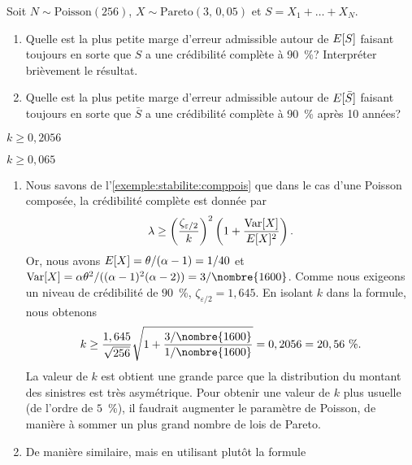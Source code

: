 \begin{exercice}
  Soit $N \sim \text{Poisson}(256)$, $X \sim \text{Pareto}(3,\, 0,05)$
  et $S = X_1 + \dots + X_N$.
  \begin{enumerate}
  \item Quelle est la plus petite marge d'erreur admissible autour de
    $E [ S ]$ faisant toujours en sorte que $S$ a une crédibilité
    complète à 90~\%?  Interpréter brièvement le résultat.
  \item Quelle est la plus petite marge d'erreur admissible autour de
    $E [ \bar{S} ]$ faisant toujours en sorte que $\bar{S}$ a une
    crédibilité complète à 90~\% après 10 années?
  \end{enumerate}
  \begin{rep}
    \begin{inparaenum}
    \item $k \geq 0,2056$
    \item $k \geq 0,065$
    \end{inparaenum}
  \end{rep}
  \begin{sol}
    \begin{enumerate}
    \item Nous savons de l'\autoref{exemple:stabilite:comppois} que
      dans le cas d'une Poisson composée, la crédibilité complète est
      donnée par
      \begin{displaymath}
        \lambda \geq
        \left(
          \frac{\zeta_{\varepsilon/2}}{k}
        \right)^2
        \left(
          1 + \frac{\operatorname{Var} [ X ]}{E [ X ]^2}
        \right).
      \end{displaymath}
      Or, nous avons $E [ X ] = \theta/(\alpha - 1) = 1/40$ et
      $\var{X} = \alpha \theta^2/((\alpha - 1)^2(\alpha - 2)) =
      3/\nombre{1600}$. Comme nous exigeons un niveau de crédibilité
      de $90$~\%, $\zeta_{\varepsilon/2} = 1,645$. En isolant $k$ dans
      la formule, nous obtenons
      \begin{displaymath}
        k \ge
        \frac{1,645}{\sqrt{256}}
        \sqrt{1 + \frac{3/\nombre{1600}}{1/\nombre{1600}}} =
        0,2056 = 20,56~\%.
      \end{displaymath}
      La valeur de $k$ est obtient une grande parce que la
      distribution du montant des sinistres est très asymétrique. Pour
      obtenir une valeur de $k$ plus usuelle (de l'ordre de $5$~\%),
      il faudrait augmenter le paramètre de Poisson, de manière à
      sommer un plus grand nombre de lois de Pareto.
    \item De manière similaire, mais en utilisant plutôt la formule

\end{enumerate}
\end{sol}
\end{exercice}
